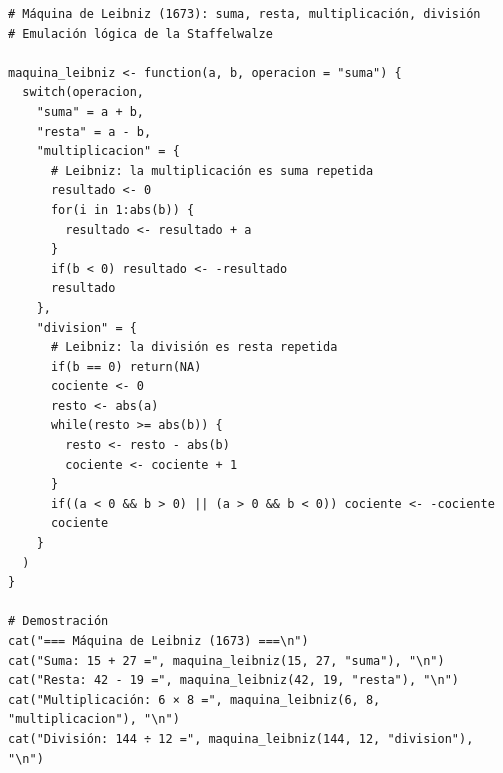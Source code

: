 \documentclass[14pt, a4paper]{article}
\begin{document}
\begin{verbatim}
# Máquina de Leibniz (1673): suma, resta, multiplicación, división
# Emulación lógica de la Staffelwalze

maquina_leibniz <- function(a, b, operacion = "suma") {
  switch(operacion,
    "suma" = a + b,
    "resta" = a - b,
    "multiplicacion" = {
      # Leibniz: la multiplicación es suma repetida
      resultado <- 0
      for(i in 1:abs(b)) {
        resultado <- resultado + a
      }
      if(b < 0) resultado <- -resultado
      resultado
    },
    "division" = {
      # Leibniz: la división es resta repetida
      if(b == 0) return(NA)
      cociente <- 0
      resto <- abs(a)
      while(resto >= abs(b)) {
        resto <- resto - abs(b)
        cociente <- cociente + 1
      }
      if((a < 0 && b > 0) || (a > 0 && b < 0)) cociente <- -cociente
      cociente
    }
  )
}

# Demostración
cat("=== Máquina de Leibniz (1673) ===\n")
cat("Suma: 15 + 27 =", maquina_leibniz(15, 27, "suma"), "\n")
cat("Resta: 42 - 19 =", maquina_leibniz(42, 19, "resta"), "\n")
cat("Multiplicación: 6 × 8 =", maquina_leibniz(6, 8, "multiplicacion"), "\n")
cat("División: 144 ÷ 12 =", maquina_leibniz(144, 12, "division"), "\n")
\end{verbatim}
\end{document}
